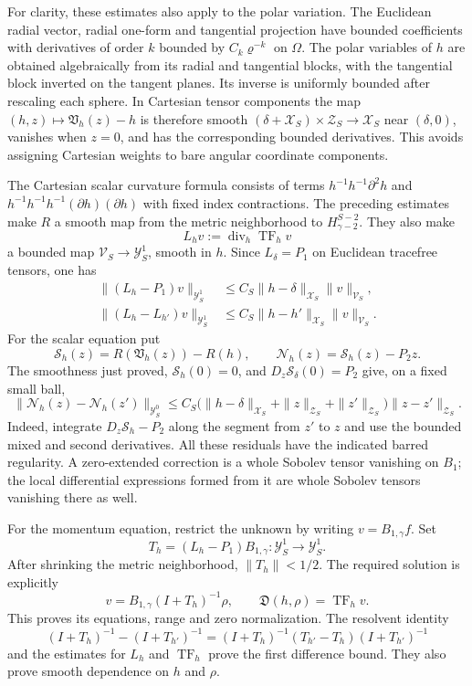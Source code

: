 \documentclass[
  english,
  11pt,
  reqno]{amsart}
\begin{document}
For clarity, these estimates also apply to the polar variation. The
Euclidean radial vector, radial one-form and tangential projection have
bounded coefficients with derivatives of order \(k\) bounded by
\(C_k\varrho^{-k}\) on \(\Omega\). The polar variables of \(h\) are
obtained algebraically from its radial and tangential blocks, with the
tangential block inverted on the tangent planes. Its inverse is
uniformly bounded after rescaling each sphere. In Cartesian tensor
components the map \((h,z)\mapsto\mathfrak V_h(z)-h\) is therefore
smooth \((\delta+\mathcal X_S)\times\mathcal Z_S\to\mathcal X_S\) near
\((\delta,0)\), vanishes when \(z=0\), and has the corresponding bounded
derivatives. This avoids assigning Cartesian weights to bare angular
coordinate components.

The Cartesian scalar curvature formula consists of terms
\(h^{-1}h^{-1}\partial^2h\) and
\(h^{-1}h^{-1}h^{-1}(\partial h)(\partial h)\) with fixed index
contractions. The preceding estimates make \(R\) a smooth map from the
metric neighborhood to \(H^{S-2}_{\gamma-2}\). They also make \[
L_hv:=\operatorname{div}_h\operatorname{TF}_h v
\] a bounded map \(\mathcal V_S\to\mathcal Y_S^1\), smooth in \(h\).
Since \(L_\delta=P_1\) on Euclidean tracefree tensors, one has \[
\begin{aligned}
\|(L_h-P_1)v\|_{\mathcal Y_S^1}
&\le C_S\|h-\delta\|_{\mathcal X_S}\|v\|_{\mathcal V_S},\\
\|(L_h-L_{h'})v\|_{\mathcal Y_S^1}
&\le C_S\|h-h'\|_{\mathcal X_S}\|v\|_{\mathcal V_S}.
\end{aligned}
\] For the scalar equation put \[
\mathcal S_h(z)=R(\mathfrak V_h(z))-R(h),\qquad
\mathcal N_h(z)=\mathcal S_h(z)-P_2z.
\] The smoothness just proved, \(\mathcal S_h(0)=0\), and
\(D_z\mathcal S_\delta(0)=P_2\) give, on a fixed small ball, \[
\|\mathcal N_h(z)-\mathcal N_h(z')\|_{\mathcal Y_S^0}
\le C_S\bigl(
\|h-\delta\|_{\mathcal X_S}
+\|z\|_{\mathcal Z_S}+\|z'\|_{\mathcal Z_S}\bigr)
\|z-z'\|_{\mathcal Z_S}.
\] Indeed, integrate \(D_z\mathcal S_h-P_2\) along the segment from
\(z'\) to \(z\) and use the bounded mixed and second derivatives. All
these residuals have the indicated barred regularity. A zero-extended
correction is a whole Sobolev tensor vanishing on \(B_1\); the local
differential expressions formed from it are whole Sobolev tensors
vanishing there as well.

For the momentum equation, restrict the unknown by writing
\(v=B_{1,\gamma}f\). Set \[
T_h=(L_h-P_1)B_{1,\gamma}:
\mathcal Y_S^1\longrightarrow\mathcal Y_S^1.
\] After shrinking the metric neighborhood, \(\|T_h\|<1/2\). The
required solution is explicitly \[
v=B_{1,\gamma}(I+T_h)^{-1}\rho,\qquad
\mathfrak D(h,\rho)=\operatorname{TF}_h v.
\] This proves its equations, range and zero normalization. The
resolvent identity \[
(I+T_h)^{-1}-(I+T_{h'})^{-1}
=(I+T_h)^{-1}(T_{h'}-T_h)(I+T_{h'})^{-1}
\] and the estimates for \(L_h\) and \(\operatorname{TF}_h\) prove the
first difference bound. They also prove smooth dependence on \(h\) and
\(\rho\).
\end{document}
